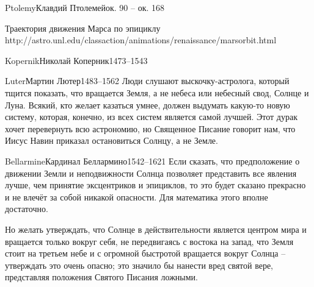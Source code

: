 \documentclass[aspectratio=169]{beamer}
\begin{document}
\begin{Person}{Ptolemy}{Клавдий Птолемей}{ок. 90 -- ок. 168}
\end{Person}

{Траектория движения Марса по эпициклу\\http://astro.unl.edu/classaction/animations/renaissance/marsorbit.html}

\begin{Person}{Kopernik}{Николай Коперник}{1473--1543}
\end{Person}

\begin{Person}{Luter}{Мартин Лютер}{1483--1562}
Люди слушают выскочку-астролога, который тщится показать, что вращается Земля, а не небеса
или небесный свод, Солнце и Луна. Всякий, кто желает казаться умнее, должен выдумать
какую-то новую систему, которая, конечно, из всех систем является самой лучшей. Этот
дурак хочет перевернуть всю астрономию, но Священное Писание говорит нам, что Иисус
Навин приказал остановиться Солнцу, а не Земле.
\end{Person}


\begin{Person}{Bellarmine}{Кардинал Беллармино}{1542--1621}
Если сказать, что предположение о движении Земли и неподвижности Солнца позволяет 
представить все явления лучше, чем принятие эксцентриков и эпициклов, 
то это будет сказано прекрасно и не влечёт за собой никакой опасности. Для математика 
этого вполне достаточно. 

Но желать утверждать, что Солнце в действительности является центром мира и
 вращается только вокруг себя, не передвигаясь с востока на запад, 
что Земля стоит на третьем небе и с огромной быстротой вращается вокруг Солнца --
 утверждать это очень опасно; это значило бы нанести вред святой вере,
 представляя положения Святого Писания ложными.
\end{Person}
\end{document}
